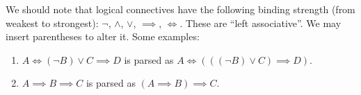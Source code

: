 \begin{node}[Precedence]\label{prop-000D}%
We should note that logical connectives have the following binding
strength (from weakest to strongest): $\neg$, $\land$, $\lor$,
$\implies$, $\iff$. These are ``left associative''. We may insert
parentheses to alter it. Some examples:
\begin{enumerate}
\item $A\iff (\neg B)\lor C\implies D$ is parsed as $A\iff(((\neg B)\lor C)\implies D)$.
\item $A\implies B\implies C$ is parsed as $(A\implies B)\implies C$.
\end{enumerate}
\end{node}

